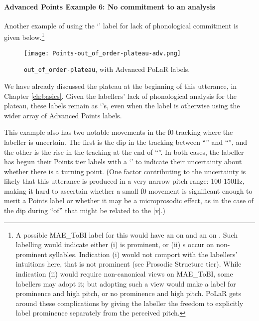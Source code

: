 \paragraph{Advanced Points Example 6: No commitment to an analysis}
Another example of using the ‘’ label for lack of phonological commitment is given below.\footnote{A possible MAE\_ToBI label for this would have an  on  and an  on . Such labelling would indicate either (i)  is prominent, or (ii) s occur on non-prominent syllables. Indication (i) would not comport with the labellers’ intuitions here, that  is not prominent (see Prosodic Structure tier). While indication (ii) would require non-canonical views on MAE\_ToBI, some labellers may adopt it; but adopting such a view would make  a label for prominence and high pitch, or no prominence and high pitch. PoLaR gets around these complications by giving the labeller the freedom to explicitly label prominence separately from the perceived pitch.}

\begin{figure}[H]
\centering
%
\texttt{[image: Points-out\_of\_order-plateau-adv.png]}
%
\caption{\texttt{out\_of\_order-plateau}, with Advanced PoLaR labels.%
\label{fig:out_of_order-plateau Points Adv}%
}
\end{figure}

We have already discussed the plateau at the beginning of this utterance, in Chapter \ref{ch:basics}. Given the labellers’ lack of phonological analysis for the plateau, these labels remain as ‘’s, even when the label is otherwise using the wider array of Advanced Points labels.

This example also has two notable movements in the f0-tracking where the labeller is uncertain. The first is the dip in the tracking between “” and “”, and the other is the rise in the tracking at the end of “”. In both cases, the labeller has begun their Points tier labels with a ‘’ to indicate their uncertainty about whether there is a turning point. (One factor contributing to the uncertainty is likely that this utterance is produced in a very narrow pitch range: 100-150Hz, making it hard to ascertain whether a small f0 movement is significant enough to merit a Points label or whether it may be a microprosodic effect, as in the case of the dip during “of” that might be related to the [v].)

